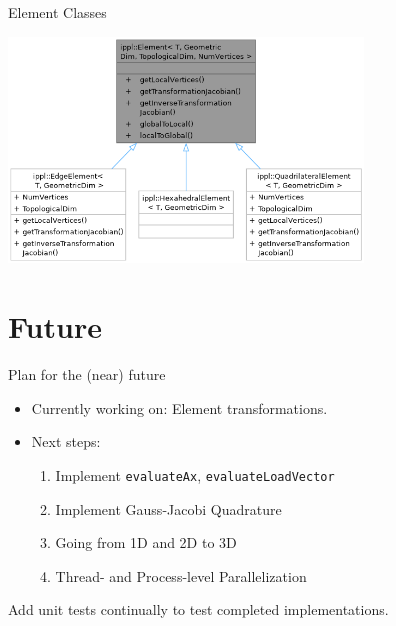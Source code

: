 \documentclass[handout,xcolor=pdftex,table,10pt,yellow,mathserif]{beamer}
\begin{document}
\begin{frame}{Element Classes}
    \begin{center}
        \includegraphics[height=6cm]{figures/classippl_1_1Element__inherit__graph.png}

    \end{center}
\end{frame}




    

\section{Future}

\begin{frame}{Plan for the (near) future}
    \begin{itemize}
        \item Currently working on: Element transformations. \pause
        \item Next steps: \begin{enumerate} \pause
            \item Implement \texttt{evaluateAx}, \texttt{evaluateLoadVector} \pause
            \item Implement Gauss-Jacobi Quadrature \pause
            \item Going from 1D and 2D to 3D \pause
            \item Thread- and Process-level Parallelization
        \end{enumerate}
    \end{itemize}
    \pause
    Add unit tests continually to test completed implementations.
\end{frame}
\end{document}
